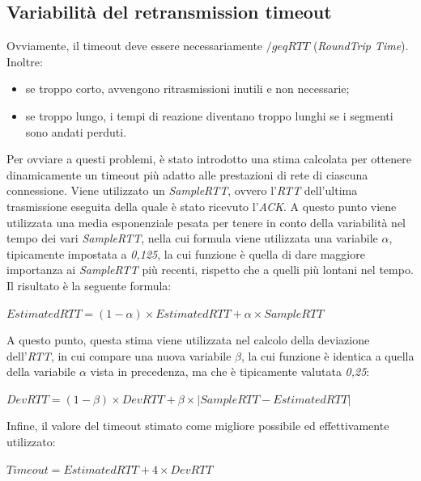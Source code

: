 \subsection{Variabilità del retransmission timeout}
Ovviamente, il timeout deve essere necessariamente $/geq RTT$ (\textit{RoundTrip Time}). Inoltre:
\begin{itemize}
    \item se troppo corto, avvengono ritrasmissioni inutili e non necessarie;
    \item se troppo lungo, i tempi di reazione diventano troppo lunghi se i segmenti sono andati perduti.
\end{itemize}
Per ovviare a questi problemi, è stato introdotto una stima calcolata per ottenere dinamicamente un timeout più adatto alle prestazioni di rete di ciascuna connessione. Viene utilizzato un \textit{SampleRTT}, ovvero l'\textit{RTT} dell'ultima trasmissione eseguita della quale è stato ricevuto l'\textit{ACK}. A questo punto viene utilizzata una media esponenziale pesata per tenere in conto della variabilità nel tempo dei vari \textit{SampleRTT}, nella cui formula viene utilizzata una variabile $\alpha$, tipicamente impostata a \textit{0,125}, la cui funzione è quella di dare maggiore importanza ai \textit{SampleRTT} più recenti, rispetto che a quelli più lontani nel tempo. Il risultato è la seguente formula: \\
\begin{center}
    $ EstimatedRTT = (1-\alpha )\times EstimatedRTT + \alpha \times SampleRTT $
\end{center}
A questo punto, questa stima viene utilizzata nel calcolo della deviazione dell'\textit{RTT}, in cui compare una nuova variabile $\beta$, la cui funzione è identica a quella della variabile $\alpha$ vista in precedenza, ma che è tipicamente valutata \textit{0,25}: \\
\begin{center}
    $ DevRTT = (1-\beta )\times DevRTT + \beta \times \left| SampleRTT - EstimatedRTT \right| $
\end{center}
Infine, il valore del timeout stimato come migliore possibile ed effettivamente utilizzato:
\begin{center}
    $ Timeout = EstimatedRTT + 4 \times DevRTT $ \\
\end{center}

